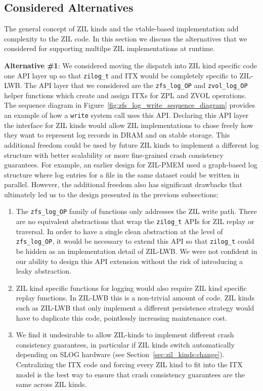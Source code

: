 \documentclass[12pt,a4paper,twoside]{book}
\begin{document}
\subsection{Considered Alternatives}
The general concept of ZIL kinds and the vtable-based implementation add complexity to the ZIL code.
In this section we discuss the alternatives that we considered for supporting multilpe ZIL implementations at runtime.

\textbf{Alternative \#1}: We considered moving the dispatch into ZIL kind specific code one API layer up so that \lstinline{zilog_t} and ITX would be completely specific to ZIL-LWB.
The API layer that we considered are the \lstinline{zfs_log_OP} and \lstinline{zvol_log_OP} helper functions which create and assign ITXs for ZPL and ZVOL operations.
The sequence diagram in Figure~\ref{fig:zfs_log_write_sequence_diagram} provides an example of how a \lstinline{write} system call uses this API.
Declaring this API layer the interface for ZIL kinds would allow ZIL implementations to chose freely how they want to represent log records in DRAM and on stable storage.
This additional freedom could be used by future ZIL kinds to implement a different log structure with better scalability or more fine-grained crash consistency guarantees.
For example, an earlier design for ZIL-PMEM used a graph-based log structure where log entries for a file in the same dataset could be written in parallel.
However, the additional freedom also has significant drawbacks that ultimately led us to the design presented in the previous subsections:
\begin{enumerate}[noitemsep]
    \item The \lstinline{zfs_log_OP} family of functions only addresses the ZIL write path.
        There are no equivalent abstractions that wrap the \lstinline{zilog_t} APIs for ZIL replay or traversal.
        In order to have a single clean abstraction at the level of \lstinline{zfs_log_OP}, it would be necessary to extend this API so that \lstinline{zilog_t} could be hidden as an implementation detail of ZIL-LWB.
        We were not confident in our ability to design this API extension without the risk of introducing a leaky abstraction.
    \item ZIL kind specific functions for logging would also require ZIL kind specific replay functions.
        In ZIL-LWB this is a non-trivial amount of code.
        ZIL kinds such as ZIL-LWB that only implement a different persistence strategy would have to duplicate this code, pointlessly increasing maintenance cost.
    \item We find it undesirable to allow ZIL-kinds to implement different crash consistency guarantees, in particular if ZIL kinds switch automatically depending on SLOG hardware (see Section~\ref{sec:zil_kinds:change}).
        Centralizing the ITX code and forcing every ZIL kind to fit into the ITX model is the best way to ensure that crash consistency guarantees are the same across ZIL kinds.
\end{enumerate}
\end{document}
